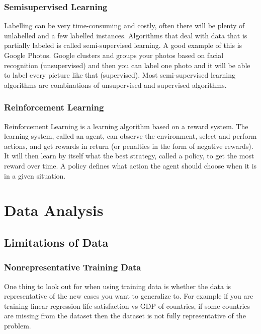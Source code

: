\documentclass[12pt]{article}
\begin{document}
        \subsubsection{Semisupervised Learning}
            Labelling can be very time-consuming and costly, often there will be plenty of unlabelled and a few labelled
            instances. Algorithms that deal with data that is partially labeled is called semi-supervised learning. A good
            example of this is Google Photos. Google clusters and groups your photos based on facial recognition
            (unsupervised) and then you can label one photo and it will be able to label every picture like that
            (supervised). Most semi-supervised learning algorithms are combinations of unsupervised and supervised
            algorithms.  
        
        \subsubsection{Reinforcement Learning}
            Reinforcement Learning is a learning algorithm based on a reward system. The learning system, called an agent,
            can observe the environment, select and perform actions, and get rewards in return (or penalties in the form of
            negative rewards). It will then learn by itself what the best strategy, called a policy, to get the most reward
            over time. A policy defines what action the agent should choose when it is in a given situation.

\section{Data Analysis}
    \subsection{Limitations of Data}
        \subsubsection{Nonrepresentative Training Data}
        One thing to look out for when using training data is whether the data is representative of the new cases you
        want to generalize to. For example if you are training linear regression life satisfaction vs GDP of countries,
        if some countries are missing from the dataset then the dataset is not fully representative of the problem.
\end{document}
